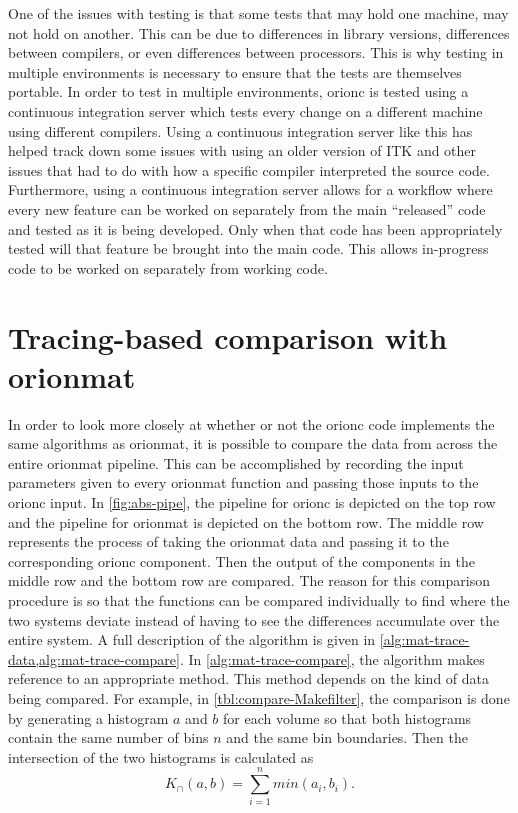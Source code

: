 One of the issues with testing is that some tests that may hold
one machine, may not hold on another. This can be due to
differences in library versions, differences between compilers, or
even differences between processors. This is why testing in
multiple environments is necessary to ensure that the tests are
themselves portable. In order to test in multiple environments,
\gls{orionc} is tested using a continuous integration server which
tests every change on a different machine using different
compilers. Using a continuous integration server like this has
helped track down some issues with using an older version of ITK
and other issues that had to do with how a specific compiler
interpreted the source code.
Furthermore, using a continuous integration server allows for a
workflow where every new feature can be worked on separately from
the main ``released'' code and tested as it is being developed.
Only when that code has been appropriately tested will that
feature be brought into the main code. This allows in-progress
code to be worked on separately from working code.

\section{Tracing-based comparison with \gls{orionmat}}

In order to look more closely at whether or not the \gls{orionc}
code implements the same algorithms as \gls{orionmat}, it is
possible to compare the data from across the entire \gls{orionmat}
pipeline. This can be accomplished by recording the input
parameters given to every \gls{orionmat} function and passing
those inputs to the \gls{orionc} input. In \cref{fig:abs-pipe},
the pipeline for \gls{orionc} is depicted on the top row and the
pipeline for \gls{orionmat} is depicted on the bottom row. The
middle row represents the process of taking the \gls{orionmat}
data and passing it to the corresponding \gls{orionc} component.
Then the output of the components in the middle row and the bottom
row are compared. The reason for this comparison procedure is so
that the functions can be compared individually to find where the
two systems deviate instead of having to see the differences
accumulate over the entire system. A full description of the
algorithm is given in
\cref{alg:mat-trace-data,alg:mat-trace-compare}. In
\cref{alg:mat-trace-compare}, the algorithm makes reference to an
appropriate method. This method depends on the kind of data being
compared. For example, in \cref{tbl:compare-Makefilter}, the
comparison is done by generating a histogram \(a\) and \(b\) for
each volume so that both histograms contain the same number of
bins \(n\) and the same bin boundaries. Then the intersection of the two
histograms is calculated as
\[ K_{\cap}(a, b) = \sum_{i = 1}^{n} min( a_i, b_i ). \]

